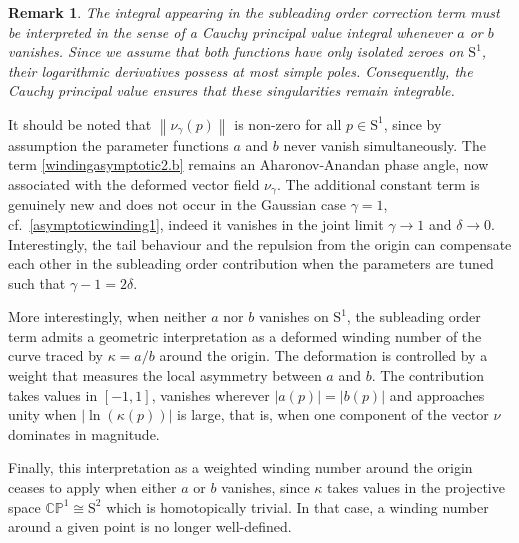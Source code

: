 \documentclass[pdflatex,sn-mathphys-num]{sn-jnl}
\theoremstyle{thmstyleone}
\newtheorem{remark}[theorem]{Remark}
\numberwithin{equation}{section}
\newcommand{\Sp}{\mathrm{S}^{1}}
\begin{document}
\begin{remark}
    The integral appearing in the subleading order correction term must be interpreted in the sense of a Cauchy principal value integral whenever $a$ or $b$ vanishes. Since we assume that both functions have only isolated zeroes on $\Sp$, their logarithmic derivatives possess at most simple poles. Consequently, the Cauchy principal value ensures that these singularities remain integrable.
\end{remark}


It should be noted that $\left\| \nu_{\gamma}\left( p \right) \right\|$ is non-zero for all $p\in\Sp$, since by assumption the parameter functions $a$ and $b$ never vanish simultaneously. The term \eqref{windingasymptotic2.b} remains an Aharonov-Anandan phase angle, now associated with the deformed vector field $\nu_{\gamma}$. The additional constant term is genuinely new and does not occur in the Gaussian case $\gamma=1$, cf.~\eqref{asymptoticwinding1}, indeed it vanishes in the joint limit $\gamma\to 1$ and $\delta\to 0$. Interestingly, the tail behaviour and the repulsion from the origin can compensate each other in the subleading order contribution when the parameters are tuned such that $\gamma-1=2\delta$.

More interestingly, when neither $a$ nor $b$ vanishes on $\Sp$, the subleading order term admits a geometric interpretation as a deformed winding number of the curve traced by $\kappa=a/b$ around the origin.
The deformation is controlled by a weight that measures the local asymmetry between $a$ and $b$. The contribution takes values in $[-1,1]$, vanishes wherever $|a(p)|=|b(p)|$ and approaches unity when $\left|\ln(\kappa(p))\right|$ is large, that is, when one component of the vector $\nu$ dominates in magnitude.


Finally, this interpretation as a weighted winding number around the origin ceases to apply when either $a$ or $b$ vanishes, since $\kappa$ takes values in the projective space $\mathbb{CP}^{1}\cong\mathrm{S}^{2}$ which is homotopically trivial. In that case, a winding number around a given point is no longer well-defined.
\end{document}
